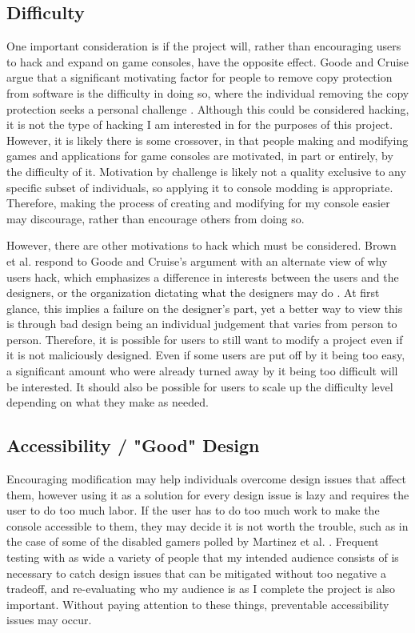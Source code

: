 \documentclass[10pt,twocolumn]{article}
\begin{document}
\subsection{Difficulty}

One important consideration is if the project will, rather than encouraging
users to hack and expand on game consoles, have the opposite effect.
Goode and Cruise argue that a significant motivating factor for people to remove
copy protection from software is the difficulty in doing so, where the
individual removing the copy protection seeks a personal challenge
\cite{goode_what_2006}. Although this could be considered hacking, it is not the
type of hacking I am interested in for the purposes of this project. However, it
is likely there is some crossover, in that people making and modifying games and
applications for game consoles are motivated, in part or entirely, by the
difficulty of it. Motivation by challenge is likely not a quality exclusive to
any specific subset of individuals, so applying it to console modding is
appropriate. Therefore, making the process of creating and modifying for my
console easier may discourage, rather than encourage others from doing so.

However, there are other motivations to hack which must be considered.
Brown et al. respond to Goode and Cruise's argument with an alternate view of
why users hack, which emphasizes a difference in interests between the users and
the designers, or the organization dictating what the designers may do
\cite{brown_why_2022}. At first glance, this implies a failure on the designer's
part, yet a better way to view this is through bad design being an individual
judgement that varies from person to person. Therefore, it is possible for users
to still want to modify a project even if it is not maliciously designed.
Even if some users are put off by it being too easy, a significant amount who
were already turned away by it being too difficult will be interested. It should
also be possible for users to scale up the difficulty level depending on what
they make as needed.

\subsection{Accessibility / "Good" Design}

Encouraging modification may help individuals overcome design issues that affect
them, however using it as a solution for every design issue is lazy and requires
the user to do too much labor. If the user has to do too much work to make the
console accessible to them, they may decide it is not worth the trouble, such as
in the case of some of the disabled gamers polled by Martinez et al.
\cite{martinez_playing_2024}. Frequent testing with as wide a variety of people
that my intended audience consists of is necessary to catch design issues that
can be mitigated without too negative a tradeoff, and re-evaluating who my
audience is as I complete the project is also important. Without paying
attention to these things, preventable accessibility issues may occur.
\end{document}
